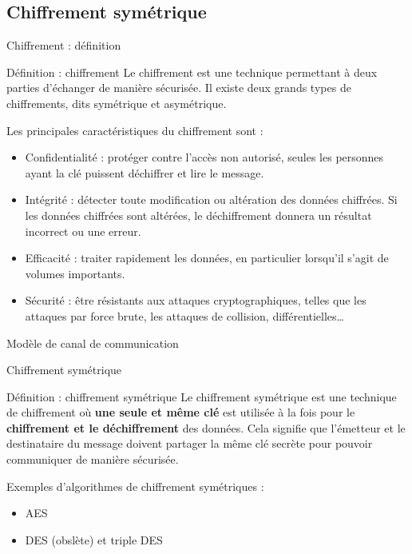 \subsection{Chiffrement symétrique}

\begin{frame}{Chiffrement : définition}
  \begin{block}{Définition : chiffrement}
    Le chiffrement est une technique permettant à deux parties d'échanger de manière sécurisée.
    Il existe deux grands types de chiffrements, dits symétrique et asymétrique.

    Les principales caractéristiques du chiffrement sont :

    \begin{itemize}
      \item Confidentialité : protéger contre l'accès non autorisé, seules les personnes ayant la clé puissent déchiffrer et lire le message.
      \item Intégrité : détecter toute modification ou altération des données chiffrées. Si les données chiffrées sont altérées, le déchiffrement donnera un résultat incorrect ou une erreur.
      \item Efficacité : traiter rapidement les données, en particulier lorsqu'il s'agit de volumes importants.
      \item Sécurité : être résistants aux attaques cryptographiques, telles que les attaques par force brute, les attaques de collision, différentielles\dots
    \end{itemize}
  \end{block}
\end{frame}

\begin{frame}{Modèle de canal de communication}
  
\end{frame}

\begin{frame}{Chiffrement symétrique}
  \begin{block}{Définition : chiffrement symétrique}
    Le chiffrement symétrique est une technique de chiffrement où \textbf{une seule et même clé} est utilisée à la fois pour le \textbf{chiffrement et le déchiffrement} des données.
    Cela signifie que l'émetteur et le destinataire du message doivent partager la même clé secrète pour pouvoir communiquer de manière sécurisée.

    \vspace{1em}

    Exemples d'algorithmes de chiffrement symétriques :

    \begin{itemize}
      \item AES
      \item DES (obslète) et triple DES
    \end{itemize}
  \end{block}
\end{frame}

